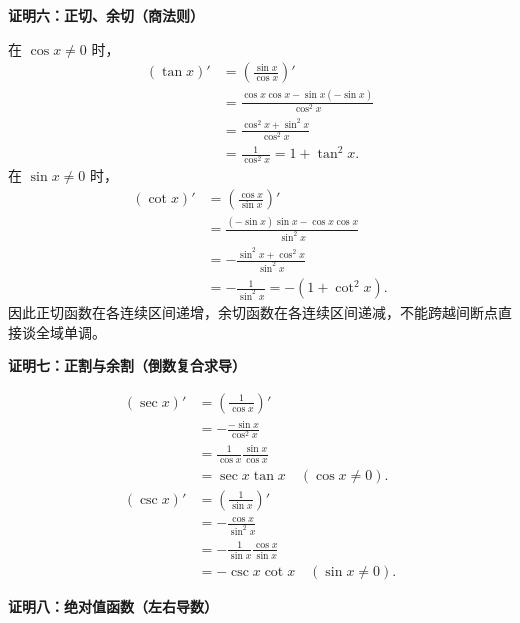 \begin{proofbox}
\medskip
\begin{minipage}{\linewidth}
\textbf{\textcolor{CProof}{证明六：正切、余切（商法则）}}


\end{minipage}

在 $\cos x\ne0$ 时，
\[
\begin{aligned}
(\tan x)'&=\left(\frac{\sin x}{\cos x}\right)'\\
&=\frac{\cos x\cos x-\sin x(-\sin x)}{\cos^2x}\\
&=\frac{\cos^2x+\sin^2x}{\cos^2x}\\
&=\frac1{\cos^2x}=1+\tan^2x.
\end{aligned}
\]
在 $\sin x\ne0$ 时，
\[
\begin{aligned}
(\cot x)'&=\left(\frac{\cos x}{\sin x}\right)'\\
&=\frac{(-\sin x)\sin x-\cos x\cos x}{\sin^2x}\\
&=-\frac{\sin^2x+\cos^2x}{\sin^2x}\\
&=-\frac1{\sin^2x}=-(1+\cot^2x).
\end{aligned}
\]
因此正切函数在各连续区间递增，余切函数在各连续区间递减，不能跨越间断点直接谈全域单调。

\medskip
\begin{minipage}{\linewidth}
\textbf{\textcolor{CProof}{证明七：正割与余割（倒数复合求导）}}


\end{minipage}
\[
\begin{aligned}
(\sec x)'&=\left(\frac1{\cos x}\right)'\\
&=-\frac{-\sin x}{\cos^2x}\\
&=\frac1{\cos x}\frac{\sin x}{\cos x}\\
&=\sec x\tan x\quad(\cos x\ne0).\\[3pt]
(\csc x)'&=\left(\frac1{\sin x}\right)'\\
&=-\frac{\cos x}{\sin^2x}\\
&=-\frac1{\sin x}\frac{\cos x}{\sin x}\\
&=-\csc x\cot x\quad(\sin x\ne0).
\end{aligned}
\]

\medskip
\begin{minipage}{\linewidth}
\textbf{\textcolor{CProof}{证明八：绝对值函数（左右导数）}}



\end{minipage}
\end{proofbox}
